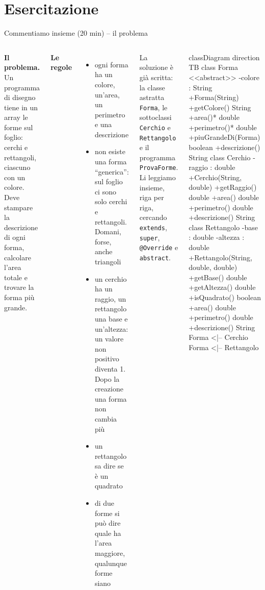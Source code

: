 \documentclass[10pt,aspectratio=169]{beamer}
\begin{document}
\section{Esercitazione}

\begin{frame}[fragile]{Commentiamo insieme (20 min) -- il problema}
\begin{columns}[T]
\footnotesize
\textbf{Il problema.} Un programma di disegno tiene in un array le forme sul foglio: cerchi e rettangoli, ciascuno con un colore. Deve stampare la descrizione di ogni forma, calcolare l'area totale e trovare la forma più grande.

\vspace{0.1cm}
\textbf{Le regole}
\begin{itemize}\itemsep=2pt
    \item ogni forma ha un colore, un'area, un perimetro e una descrizione
    \item non esiste una forma ``generica'': sul foglio ci sono solo cerchi e rettangoli. Domani, forse, anche triangoli
    \item un cerchio ha un raggio, un rettangolo una base e un'altezza: un valore non positivo diventa 1. Dopo la creazione una forma non cambia più
    \item un rettangolo sa dire se è un quadrato
    \item di due forme si può dire quale ha l'area maggiore, qualunque forme siano
\end{itemize}

\vspace{0.1cm}
La soluzione è già scritta: la classe astratta \texttt{Forma}, le sottoclassi \texttt{Cerchio} e \texttt{Rettangolo} e il programma \texttt{ProvaForme}. Li leggiamo insieme, riga per riga, cercando \texttt{extends}, \texttt{super}, \texttt{@Override} e \texttt{abstract}.

\begin{mermaid}
classDiagram
  direction TB
  class Forma {
    <<abstract>>
    -colore : String
    +Forma(String)
    +getColore() String
    +area()* double
    +perimetro()* double
    +piuGrandeDi(Forma) boolean
    +descrizione() String
  }
  class Cerchio {
    -raggio : double
    +Cerchio(String, double)
    +getRaggio() double
    +area() double
    +perimetro() double
    +descrizione() String
  }
  class Rettangolo {
    -base : double
    -altezza : double
    +Rettangolo(String, double, double)
    +getBase() double
    +getAltezza() double
    +isQuadrato() boolean
    +area() double
    +perimetro() double
    +descrizione() String
  }
  Forma <|-- Cerchio
  Forma <|-- Rettangolo
\end{mermaid}
\end{columns}
\end{frame}
\end{document}
